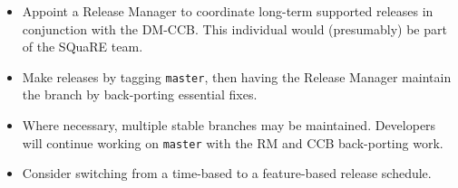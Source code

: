 \documentclass[letterpaper]{scrartcl}
\begin{document}
\begin{itemize}

  \item{Appoint a Release Manager to coordinate long-term supported releases
  in conjunction with the DM-CCB. This individual would (presumably) be part
  of the SQuaRE team.}

  \item{Make releases by tagging \texttt{master}, then having the Release
  Manager maintain the branch by back-porting essential fixes.}

  \item{Where necessary, multiple stable branches may be maintained.
  Developers will continue working on \texttt{master} with the RM and CCB
  back-porting work.}

  \item{Consider switching from a time-based to a feature-based release
  schedule.}

\end{itemize}
\end{document}
